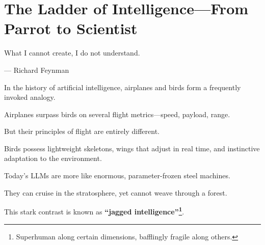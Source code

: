 




\chapter{The Ladder of Intelligence---From Parrot to Scientist}

\begin{myquote}
What I cannot create, I do not understand.

\hfill --- Richard Feynman
\end{myquote}


In the history of artificial intelligence, airplanes and birds form a frequently invoked analogy.

Airplanes surpass birds on several flight metrics---speed, payload, range.

But their principles of flight are entirely different.

\vspace{1em}

Birds possess lightweight skeletons, wings that adjust in real time, and instinctive adaptation to the environment.

Today's LLMs are more like enormous, parameter-frozen steel machines.

They can cruise in the stratosphere, yet cannot weave through a forest.

This stark contrast is known as \textbf{``jagged intelligence''\footnote{Superhuman along certain dimensions, bafflingly fragile along others.}}.

\vspace{1em}

